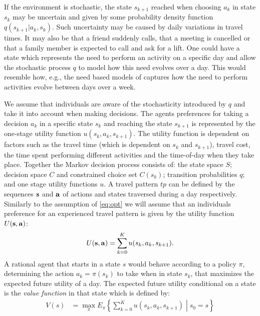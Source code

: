 If the environment is stochastic, the state $s_{k+1}$ reached when choosing $a_k$ in state $s_k$ may be uncertain and given by some probability density function $q(s_{k+1}|a_k,s_k)$. Such uncertainty may be caused by daily variations in travel times. It may also be that a friend suddenly calls, that a meeting is cancelled or that a family member is expected to call and ask for a lift. One could have a state which represents the need to perform an activity on a specific day and allow the stochastic process $q$ to model how this need evolves over a day. This would resemble how, e.g., the need based models of \citet{arentze11} captures how the need to perform activities evolve between days over a week. 

We assume that individuals are aware of the stochasticity introduced by $q$ and take it into account when making decisions. The agents preferences for taking a decision $a_k$ in a specific state $s_k$ and reaching the state $s_{k+1}$ is represented by the one-stage utility function $u(s_k,a_k,s_{k+1})$. The utility function is dependent on factors such as the travel time (which is dependent on $s_k$ and $s_{k+1}$), travel cost, the time spent performing different activities and the time-of-day when they take place. Together the Markov decision process consists of: the state space $S$; decision space $C$ and constrained choice set $C(s_k)$; transition probabilities $q$; and one stage utility functions $u$. A travel pattern $tp$ can be defined by the sequences $\mathbf{s}$ and $\mathbf{a}$ of actions and states traversed during a day respectively. Similarly to the assumption of \eqref{eq:opt} we will assume that an individuals preference for an experienced travel pattern is given by the utility function $U(\mathbf{s},\mathbf{a})$:
\begin{equation}
    U(\bs,\ba) = \sum_{k=0}^K u(s_k,a_k,s_{k+1}).
\end{equation}
A rational agent that starts in a state $s$ would behave according to a policy $\pi$, determining the action $a_k=\pi(s_k)$ to take when in state $s_k$, that maximizes the expected future utility  of a day. The expected future utility conditional on a state is the \emph{value function} in that state which is defined by: 
\begin{equation}\label{eq:vf}
\begin{aligned}
V(s) & = \max_{\pi} E_\pi \left\{ \sum_{k=0}^K u(s_k,a_k,s_{k+1})\middle | s_0 = s \right\}  
\end{aligned}
\end{equation}
